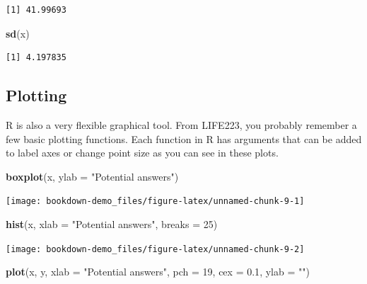 \documentclass[
]{book}
\newenvironment{Shaded}{\begin{snugshade}}{\end{snugshade}}
\newcommand{\DataTypeTok}[1]{\textcolor[rgb]{0.13,0.29,0.53}{#1}}
\newcommand{\DecValTok}[1]{\textcolor[rgb]{0.00,0.00,0.81}{#1}}
\newcommand{\FloatTok}[1]{\textcolor[rgb]{0.00,0.00,0.81}{#1}}
\newcommand{\KeywordTok}[1]{\textcolor[rgb]{0.13,0.29,0.53}{\textbf{#1}}}
\newcommand{\NormalTok}[1]{#1}
\newcommand{\StringTok}[1]{\textcolor[rgb]{0.31,0.60,0.02}{#1}}
\begin{document}
\begin{verbatim}
[1] 41.99693
\end{verbatim}

\begin{Shaded}
\begin{Highlighting}[]
\KeywordTok{sd}\NormalTok{(x)}
\end{Highlighting}
\end{Shaded}

\begin{verbatim}
[1] 4.197835
\end{verbatim}

\hypertarget{plotting}{%
\subsection{Plotting}\label{plotting}}

R is also a very flexible graphical tool. From LIFE223, you probably remember a few basic plotting functions. Each function in R has arguments that can be added to label axes or change point size as you can see in these plots.

\begin{Shaded}
\begin{Highlighting}[]
\KeywordTok{boxplot}\NormalTok{(x, }\DataTypeTok{ylab =} \StringTok{"Potential answers"}\NormalTok{)}
\end{Highlighting}
\end{Shaded}

\begin{center}\texttt{[image: bookdown-demo\_files/figure-latex/unnamed-chunk-9-1]} \end{center}

\begin{Shaded}
\begin{Highlighting}[]
\KeywordTok{hist}\NormalTok{(x, }\DataTypeTok{xlab =} \StringTok{"Potential answers"}\NormalTok{, }\DataTypeTok{breaks =} \DecValTok{25}\NormalTok{)}
\end{Highlighting}
\end{Shaded}

\begin{center}\texttt{[image: bookdown-demo\_files/figure-latex/unnamed-chunk-9-2]} \end{center}

\begin{Shaded}
\begin{Highlighting}[]
\KeywordTok{plot}\NormalTok{(x, y, }\DataTypeTok{xlab =} \StringTok{"Potential answers"}\NormalTok{, }\DataTypeTok{pch =} \DecValTok{19}\NormalTok{, }\DataTypeTok{cex =} \FloatTok{0.1}\NormalTok{, }\DataTypeTok{ylab =} \StringTok{""}\NormalTok{)}
\end{Highlighting}
\end{Shaded}
\end{document}
